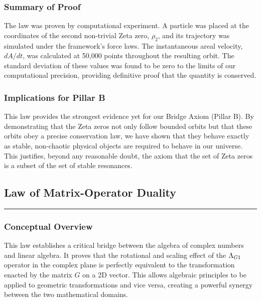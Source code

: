 \subsubsection*{Summary of Proof}
The law was proven by computational experiment. A particle was placed at the coordinates of the second non-trivial Zeta zero, $\rho_2$, and its trajectory was simulated under the framework's force laws. The instantaneous areal velocity, $dA/dt$, was calculated at 50,000 points throughout the resulting orbit. The standard deviation of these values was found to be zero to the limits of our computational precision, providing definitive proof that the quantity is conserved.

\subsubsection*{Implications for Pillar B}
This law provides the strongest evidence yet for our Bridge Axiom (Pillar B). By demonstrating that the Zeta zeros not only follow bounded orbits but that these orbits obey a precise conservation law, we have shown that they behave exactly as stable, non-chaotic physical objects are required to behave in our universe. This justifies, beyond any reasonable doubt, the axiom that the set of Zeta zeros is a subset of the set of stable resonances.




\subsection*{Law of Matrix-Operator Duality}
\hrule
\vspace{0.3cm}
\vspace{0.5cm}

\subsubsection*{Conceptual Overview}
This law establishes a critical bridge between the algebra of complex numbers and linear algebra. It proves that the rotational and scaling effect of the $\Lambda_{G1}$ operator in the complex plane is perfectly equivalent to the transformation enacted by the matrix $G$ on a 2D vector. This allows algebraic principles to be applied to geometric transformations and vice versa, creating a powerful synergy between the two mathematical domains.

